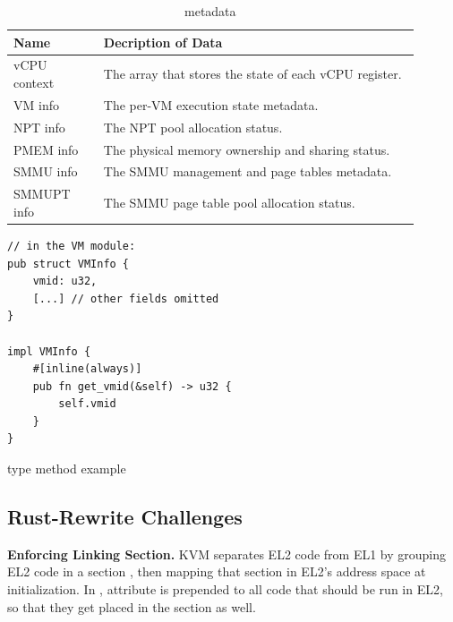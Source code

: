 \begin{table}
\begin{tabular}{ |p{0.2\linewidth}|p{0.7\linewidth}| }
\hline
\footnotesize \textbf{Name} & \footnotesize \textbf{Decription of Data} \\ \hline
\footnotesize vCPU context & \footnotesize The array that stores the state of each vCPU register. \\ \hline
\footnotesize VM info & \footnotesize The per-VM execution state metadata. \\ \hline
\footnotesize NPT info & \footnotesize The NPT pool allocation status. \\ \hline
\footnotesize PMEM info & \footnotesize The physical memory ownership and sharing status. \\ \hline
\footnotesize SMMU info & \footnotesize The SMMU management and page tables metadata. \\ \hline
\footnotesize SMMUPT info & \footnotesize The SMMU page table pool allocation status. \\ \hline
\end{tabular}
\vspace{0.2cm}
\caption{\rustcore{} metadata}
\label{tab:metadata}
\vspace{-0.4cm}
\end{table}

\begin{listing}[ht]
    \begin{verbatim}
// in the VM module:
pub struct VMInfo {
    vmid: u32,
    [...] // other fields omitted
}

impl VMInfo {
    #[inline(always)]
    pub fn get_vmid(&self) -> u32 {
        self.vmid
    }
}
    \end{verbatim}
    \caption{type method example}
    \label{lst:typemethod}
    \vspace{-0.2cm}
\end{listing}

\subsection{Rust-Rewrite Challenges}
\textbf{Enforcing Linking Section.}
KVM separates EL2 code from EL1 by grouping EL2 code in a section
, then mapping that section in EL2's address space at
initialization.
In \rustcore{}, attribute \code{\#[link\_section = ".hyp.text"]} is prepended
to all code that should be run in EL2, so that they get placed in the
 section as well.

